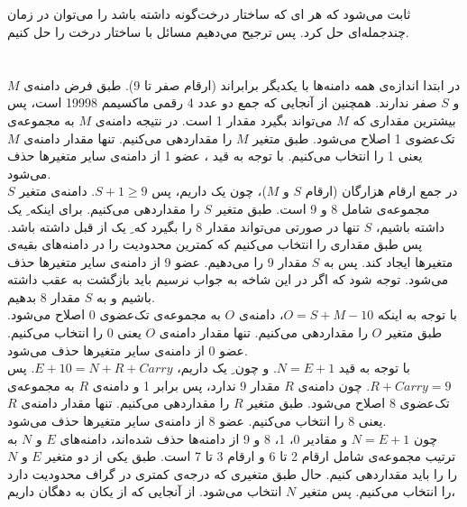\documentclass{article}
\begin{document}
\subsection{}
ثابت می‌شود که هر ای که ساختار درخت‌گونه داشته باشد را می‌توان در زمان چندجمله‌ای حل کرد. پس ترجيح مي‌دهيم مسائل  با ساختار درخت را حل كنيم.

\section{}
در ابتدا اندازه‌ی همه دامنه‌ها با یکدیگر برابراند (ارقام صفر تا 9). طبق فرض دامنه‌ی $M$ و $S$ صفر ندارند. همچنین از آنجایی که جمع دو عدد 4 رقمی ماکسیمم 19998 است، پس بیشترین مقداری که $M$ می‌تواند بگیرد مقدار 1 است. در نتیجه دامنه‌ی $M$ به مجموعه‌ی تک‌عضوی 1 اصلاح می‌شود. طبق  متغیر $M$ را مقداردهی می‌کنیم. تنها مقدار دامنه‌ی $M$ یعنی 1 را انتخاب می‌کنیم. با توجه به قید ، عضو 1 از دامنه‌ی سایر متغیرها حذف می‌شود.\\
در جمع ارقام ‌هزارگان (ارقام $S$ و $M$)، چون  یک داریم، پس 
$S+1 \ge 9$.
دامنه‌ی متغیر $S$ مجموعه‌ی شامل 8 و 9 است. طبق  متغیر $S$ را مقداردهی می‌کنیم. برای اینکه ِ یک داشته باشیم، $S$ تنها در صورتی می‌تواند مقدار 8 را بگیرد که ِ یک از قبل داشته باشد. پس طبق  مقداری را انتخاب می‌کنیم که کمترین محدودیت را در دامنه‌های بقیه‌ی متغیرها ایجاد کند. پس به $S$ مقدار 9 را می‌دهیم. عضو 9 از دامنه‌ی سایر متغیرها حذف می‌شود. توجه شود که اگر در این شاخه به جواب نرسیم باید بازگشت به عقب داشته باشیم و به $S$ مقدار 8 بدهیم.\\
با توجه به اینکه 
$O=S+M-10$،
دامنه‌ی $O$ به مجموعه‌ی تک‌عضوی 0 اصلاح می‌شود. طبق  متغیر $O$ را مقداردهی می‌کنیم. تنها مقدار دامنه‌ی $O$ یعنی 0 را انتخاب می‌کنیم. عضو 0 از دامنه‌ی سایر متغیرها حذف می‌شود.\\
با توجه به قید  $N=E+1$. و چون ِ یک داریم، $E+10= N+R+Carry$. پس 
$R+Carry=9$.
چون دامنه‌ی $R$ مقدار 9 ندارد، پس  برابر 1 و دامنه‌ی $R$ به مجموعه‌ی تک‌عضوی 8 اصلاح می‌شود. طبق  متغیر $R$ را مقداردهی می‌کنیم. تنها مقدار دامنه‌ی $R$ یعنی 8 را انتخاب می‌کنیم. عضو 8 از دامنه‌ی سایر متغیرها حذف می‌شود.\\
چون
$N=E+1$
و مقادیر 0، 1، 8 و 9 از دامنه‌ها حذف شده‌اند، دامنه‌های $E$ و $N$ به ترتیب مجموعه‌ی شامل ارقام 2 تا 6 و ارقام 3 تا 7 است. طبق  یکی از دو متغیر $E$ و $N$ را را باید مقداردهی ‌کنیم. حال طبق  متغیری که درجه‌ی کمتری در گراف محدودیت دارد را انتخاب می‌کنیم. پس متغیر $N$ انتخاب می‌شود. از آنجایی که از یکان به دهگان  داریم، 
\end{document}
